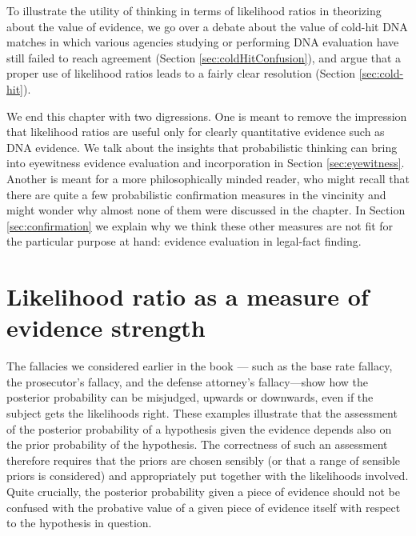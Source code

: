 \documentclass[10pt,dvipsnames,enabledeprecatedfontcommands]{scrartcl}
\begin{document}
To illustrate the utility of thinking in terms of likelihood ratios in
theorizing about the value of evidence, we go over a debate about the
value of cold-hit DNA matches in which various agencies studying or
performing DNA evaluation have still failed to reach agreement (Section
\ref{sec:coldHitConfusion}), and argue that a proper use of likelihood
ratios leads to a fairly clear resolution (Section \ref{sec:cold-hit}).

We end this chapter with two digressions. One is meant to remove the
impression that likelihood ratios are useful only for clearly
quantitative evidence such as DNA evidence. We talk about the insights
that probabilistic thinking can bring into eyewitness evidence
evaluation and incorporation in Section \ref{sec:eyewitness}. Another is
meant for a more philosophically minded reader, who might recall that
there are quite a few probabilistic confirmation measures in the
vincinity and might wonder why almost none of them were discussed in the
chapter. In Section \ref{sec:confirmation} we explain why we think these
other measures are not fit for the particular purpose at hand: evidence
evaluation in legal-fact finding.

\section{\texorpdfstring{Likelihood ratio as a measure of evidence
strength
\label{sec:lr}}{Likelihood ratio as a measure of evidence strength }}\label{likelihood-ratio-as-a-measure-of-evidence-strength}

The fallacies we considered earlier in the book ---
such as the base rate fallacy, the prosecutor's fallacy, and the defense
attorney's fallacy---show how the posterior probability can be
misjudged, upwards or downwards, even if the subject gets the
likelihoods right. These examples illustrate that the assessment of the
posterior probability of a hypothesis given the evidence depends also on
the prior probability of the hypothesis. The correctness of such an
assessment therefore requires that the priors are chosen sensibly (or
that a range of sensible priors is considered) and appropriately put
together with the likelihoods involved. Quite crucially, the posterior
probability given a piece of evidence should not be confused with the
probative value of a given piece of evidence itself with respect to the
hypothesis in question.
\end{document}
